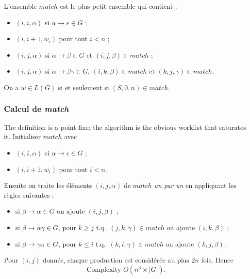 \begin{definition}
  L'ensemble $\mathit{match}$ est le plus petit ensemble qui contient :
  \begin{itemize}
    \item $(i,i,\alpha)$ si $\alpha \to \epsilon \in G$ ;
    \item $(i,i+1,w_{i})$ pour tout $i < n$ ;
    \item $(i,j,\alpha)$ si $\alpha \to \beta \in G$ et
      $(i,j,\beta) \in \mathit{match}$ ;
    \item $(i,j,\alpha)$ si $\alpha \to \beta\gamma \in G$,
      $(i,k,\beta) \in \mathit{match}$ et $(k,j,\gamma) \in \mathit{match}$.
  \end{itemize}
\end{definition}

\begin{theorem}
  On a $w \in L(G)$ si et seulement si $(S,0,n) \in \mathit{match}$.
\end{theorem}

\subsubsection{Calcul de \textit{match}}
The definition is a point fixe; the algorithm is the obvious worklist that
saturates it. Initialiser $\mathit{match}$ avec
\begin{itemize}
  \item $(i,i,\alpha)$ si $\alpha \to \epsilon \in G$ ;
  \item $(i,i+1,w_{i})$ pour tout $i < n$.
\end{itemize}
Ensuite on traite les éléments $(i,j,\alpha)$ de $\mathit{match}$ \emph{un par
un} en appliquant les règles suivantes :
\begin{itemize}
  \item si $\beta \to \alpha \in G$ on ajoute $(i,j,\beta)$ ;
  \item si $\beta \to \alpha\gamma \in G$, pour $k \geq j$ t.q.\
    $(j,k,\gamma) \in \mathit{match}$ on ajoute $(i,k,\beta)$ ;
  \item si $\beta \to \gamma\alpha \in G$, pour $k \leq i$ t.q.\
    $(k,i,\gamma) \in \mathit{match}$ on ajoute $(k,j,\beta)$.
\end{itemize}

Pour $(i,j)$ donnés, chaque production est considérée au plus $2n$ fois.
Hence
\[
  \boxed{\text{Complexity } O(n^{3} \times |G|)} .
\]


